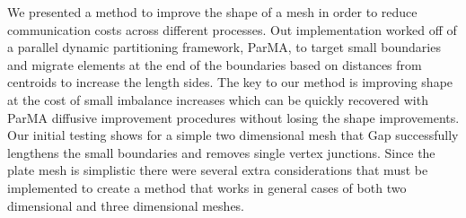 \documentclass{thesis}
\begin{document}
We presented a method to improve the shape of a mesh in order to reduce 
communication costs across different processes. Out implementation worked off of 
a parallel dynamic partitioning framework, ParMA, to target small boundaries 
and migrate elements at the end of the boundaries based on distances from 
centroids to increase the length sides. The key to our method is improving 
shape at the cost of small imbalance increases which can be quickly recovered 
with ParMA diffusive improvement procedures without losing the shape 
improvements. Our initial testing shows for a simple two dimensional mesh that 
Gap successfully lengthens the small boundaries and removes single vertex junctions. 
Since the plate mesh is 
simplistic there were several extra considerations that must be implemented 
to create a method that works in general cases of both two dimensional and 
three dimensional meshes. 

\endgroup




\end{document}
